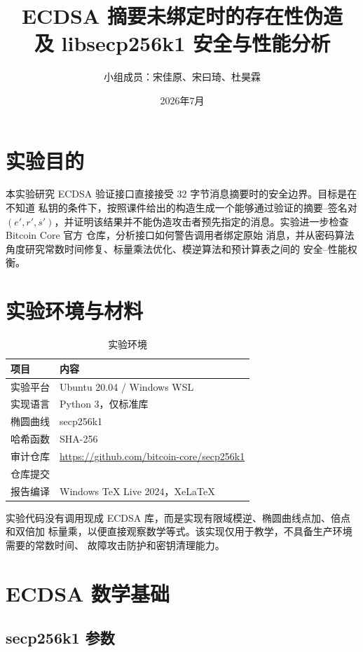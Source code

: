 \documentclass[UTF8,a4paper,12pt]{ctexart}
\title{ECDSA 摘要未绑定时的存在性伪造\\及 libsecp256k1 安全与性能分析}
\author{小组成员：宋佳原、宋曰琦、杜昊霖}
\date{2026年7月}
\newcommand{\code}[1]{\texttt{\detokenize{#1}}}
\begin{document}
\maketitle
\tableofcontents
\newpage

\section{实验目的}

本实验研究 ECDSA 验证接口直接接受 32 字节消息摘要时的安全边界。目标是在不知道
私钥的条件下，按照课件给出的构造生成一个能够通过验证的摘要--签名对
$(e',r',s')$，并证明该结果并不能伪造攻击者预先指定的消息。实验进一步检查
Bitcoin Core 官方 \code{libsecp256k1} 仓库，分析接口如何警告调用者绑定原始
消息，并从密码算法角度研究常数时间修复、标量乘法优化、模逆算法和预计算表之间的
安全--性能权衡。

\section{实验环境与材料}

\begin{table}[h]
  \centering
  \begin{tabular}{ll}
    \toprule
    项目 & 内容 \\
    \midrule
    实验平台 & Ubuntu 20.04 / Windows WSL \\
    实现语言 & Python 3，仅标准库 \\
    椭圆曲线 & secp256k1 \\
    哈希函数 & SHA-256 \\
    审计仓库 & \url{https://github.com/bitcoin-core/secp256k1} \\
    仓库提交 & \code{d2d04864ef9b056151603a3ced7980958b058028} \\
    报告编译 & Windows TeX Live 2024，XeLaTeX \\
    \bottomrule
  \end{tabular}
  \caption{实验环境}
\end{table}

实验代码没有调用现成 ECDSA 库，而是实现有限域模逆、椭圆曲线点加、倍点和双倍加
标量乘，以便直接观察数学等式。该实现仅用于教学，不具备生产环境需要的常数时间、
故障攻击防护和密钥清理能力。

\section{ECDSA 数学基础}

\subsection{secp256k1 参数}
\end{document}
